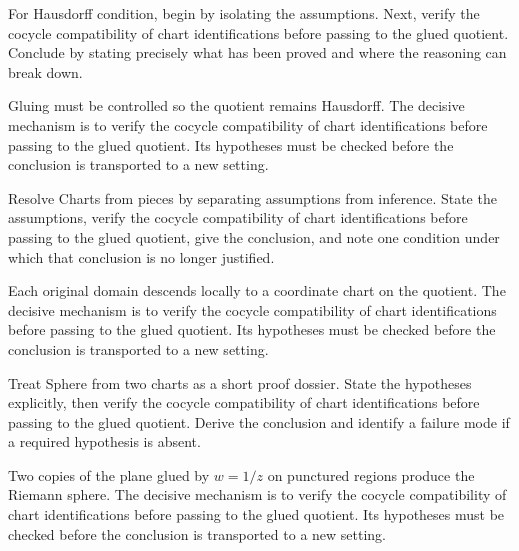 \begin{problem}\label{prob:iv25-problem-04}
For Hausdorff condition, begin by isolating the assumptions. Next, verify the cocycle compatibility of chart identifications before passing to the glued quotient. Conclude by stating precisely what has been proved and where the reasoning can break down.
\end{problem}
\begin{solution}
Gluing must be controlled so the quotient remains Hausdorff. The decisive mechanism is to verify the cocycle compatibility of chart identifications before passing to the glued quotient. Its hypotheses must be checked before the conclusion is transported to a new setting.
\end{solution}

\begin{problem}\label{prob:iv25-problem-05}
Resolve Charts from pieces by separating assumptions from inference. State the assumptions, verify the cocycle compatibility of chart identifications before passing to the glued quotient, give the conclusion, and note one condition under which that conclusion is no longer justified.
\end{problem}
\begin{solution}
Each original domain descends locally to a coordinate chart on the quotient. The decisive mechanism is to verify the cocycle compatibility of chart identifications before passing to the glued quotient. Its hypotheses must be checked before the conclusion is transported to a new setting.
\end{solution}

\begin{problem}\label{prob:iv25-problem-06}
Treat Sphere from two charts as a short proof dossier. State the hypotheses explicitly, then verify the cocycle compatibility of chart identifications before passing to the glued quotient. Derive the conclusion and identify a failure mode if a required hypothesis is absent.
\end{problem}
\begin{solution}
Two copies of the plane glued by $w=1/z$ on punctured regions produce the Riemann sphere. The decisive mechanism is to verify the cocycle compatibility of chart identifications before passing to the glued quotient. Its hypotheses must be checked before the conclusion is transported to a new setting.
\end{solution}

